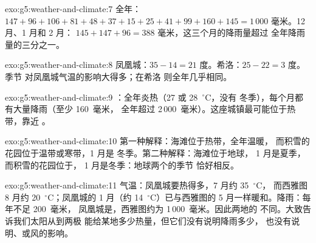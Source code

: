 \begin{solution}{exo:g5:weather-and-climate:7}
全年：$147 + 96 + 106 + 81 + 48 + 37 + 15 + 25 + 41 + 99 + 160 + 145
= 1\,000$ 毫米。12 月、1 月和 2 月：
$145 + 147 + 96 = 388$ 毫米，这三个月的降雨量超过
全年降雨量的三分之一。
\end{solution}

\begin{solution}{exo:g5:weather-and-climate:8}
凤凰城：$35 - 14 = 21$ 度。希洛：$25 - 22 = 3$ 度。季节
对凤凰城气温的影响大得多；在希洛
则全年几乎相同。
\end{solution}

\begin{solution}{exo:g5:weather-and-climate:9}
：全年炎热（27 或 28~$^\circ$C，没有
冬季），每个月都有大量降雨（至少 160~毫米，
全年超过 2\,000~毫米）。这座城镇最可能位于热带，靠近
。
\end{solution}

\begin{solution}{exo:g5:weather-and-climate:10}
第一种解释：海滩位于热带，全年温暖，
而积雪的花园位于温带或寒带，1 月是
冬季。第二种解释：海滩位于地球，
1 月是夏季，而积雪的花园位于，
1 月是冬季：地球两个的季节
恰好相反。
\end{solution}

\begin{solution}{exo:g5:weather-and-climate:11}
气温：凤凰城要热得多，7 月约 35~$^\circ$C，
而西雅图 8 月约 20~$^\circ$C；凤凰城的 1 月（约
14~$^\circ$C）已与西雅图的 5 月一样暖和。降雨：每年不足 200~毫米，
凤凰城是，西雅图约为 1\,000~毫米。因此两地的
不同。大致告诉我们太阳从到两极
能给某地多少热量，但它们没有说明降雨多少，
也没有说明、或风的影响。
\end{solution}
